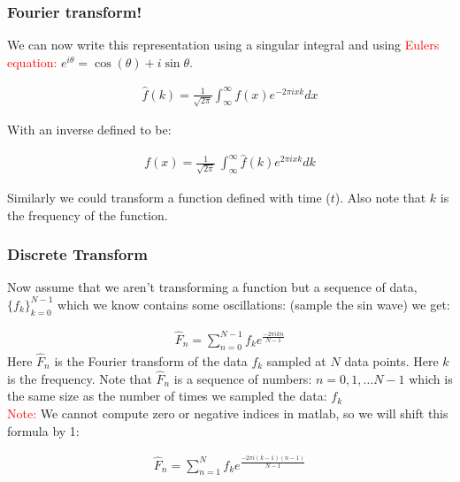 \documentclass[serif]{beamer}
\begin{document}
%
%
\begin{frame}
\frametitle{Fourier transform!}
We can now write this representation using a singular integral and using \textcolor{red}{Eulers equation:} $ e^{i\theta} = \cos(\theta) + i\sin{\theta}$. 

\begin{align*}
\hat{f}(k) = \frac{1}{\sqrt{2\pi}}\int^{\infty}_{\infty}f(x)e^{-2\pi i x k}dx
\end{align*}

With an inverse defined to be: 


\begin{align*}
f(x) = \frac{1}{\sqrt{2\pi}}\ \int^{\infty}_{\infty}\hat{f}(k)e^{2\pi i x k}dk
\end{align*}

Similarly we could transform a function defined with time ($t$). Also note that $k$ is the frequency of the function. 

\end{frame}


\begin{frame}
\frametitle{Discrete Transform} 

Now assume that we aren't transforming a function but a sequence of data, $\{f_{k}\}_{k=0}^{N-1}$ which we know contains some oscillations: (sample the sin wave) we get: 


\begin{align*}
\hat{F}_n = \sum_{n = 0}^{N-1}f_ke^{\frac{-2\pi i k n}{N-1}}
\end{align*}
Here $\hat{F}_n$ is the Fourier transform of the data $f_k$ sampled at $N$ data points. Here $k$ is the frequency. Note that $\hat{F}_n$ is a sequence of numbers: $n = 0,1,\hdots N-1$ which is the same size as the number of times we sampled the data: $f_k$\\

\textcolor{red}{Note:} We cannot compute zero or negative indices in matlab, so we will shift this formula by 1: 

\begin{align*}
\hat{F}_n = \sum_{n = 1}^{N}f_ke^{\frac{-2\pi i (k-1) (n-1)}{N-1}}
\end{align*}

\end{frame}
\end{document}
